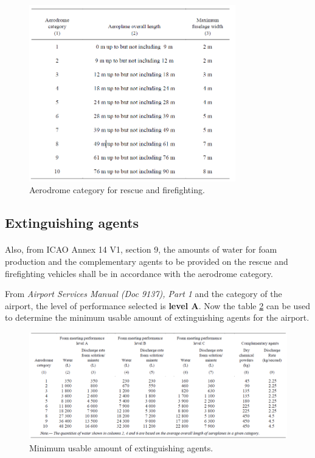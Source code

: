 		\begin{figure}[H]
			\centering
			\includegraphics[clip, trim=0cm 0cm 0cm 0cm, width=0.8\textwidth]{./images/firefighting/table91}
			\caption{Aerodrome category for rescue and firefighting.}
			\label{table91}
		\end{figure}
	
		\subsection{Extinguishing agents}
		\paragraph{} Also, from ICAO Annex 14 V1, section 9, the amounts of water for foam production and the complementary agents to be provided on the rescue and firefighting vehicles shall be in accordance with the aerodrome category.
		
		From \textit{Airport Services Manual (Doc 9137), Part 1} and the category of the airport, the level of performance selected is \textbf{level A}. Now the table \ref{table92} can be used to determine the minimum usable amount of extinguishing agents for the airport.  
		\begin{figure}[H]
			\centering
			\includegraphics[clip, trim=0cm 0cm 0cm 0cm, width=1\textwidth]{./images/firefighting/table92}
			\caption{Minimum usable amount of extinguishing agents.}
			\label{table92}
		\end{figure}
	
